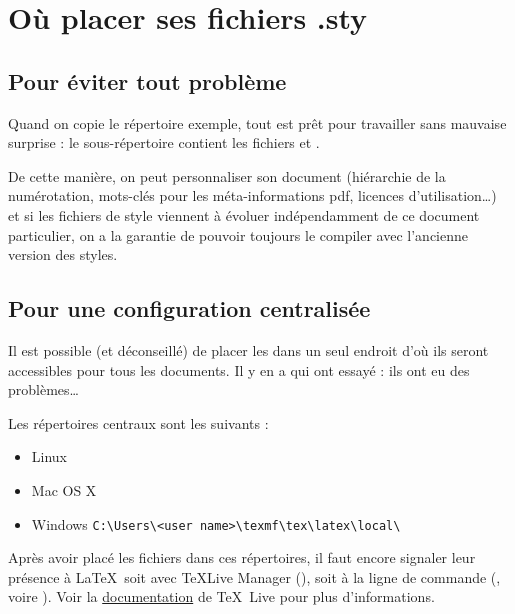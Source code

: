 \section{Où placer ses fichiers .sty}



\subsection{Pour éviter tout problème}

Quand on copie le répertoire exemple, tout est prêt pour travailler sans mauvaise surprise : le sous-répertoire  contient les fichiers  et .

De cette manière, on peut personnaliser son document (hiérarchie de la numérotation, mots-clés pour les méta-informations pdf, licences d'utilisation\dots) et si les fichiers de style viennent à évoluer indépendamment de ce document particulier, on a la garantie de pouvoir toujours le compiler avec l'ancienne version des styles.



\subsection{Pour une configuration centralisée}

Il est possible (et déconseillé) de placer les  dans un seul endroit d'où ils seront accessibles pour tous les documents. Il y en a qui ont essayé : ils ont eu des problèmes\dots

Les répertoires centraux sont les suivants :
\begin{itemize}
	\item Linux 
	\item Mac OS X 
	\item Windows \Verb!C:\Users\<user name>\texmf\tex\latex\local\!
\end{itemize}

Après avoir placé les fichiers dans ces répertoires, il faut encore signaler leur présence à \LaTeX \ soit avec \TeX Live Manager (), soit à la ligne de commande (, voire ). Voir la  \href{http://tug.org/texlive/doc/texlive-fr/texlive-fr.pdf}{documentation} de \TeX \ Live pour plus d'informations.





